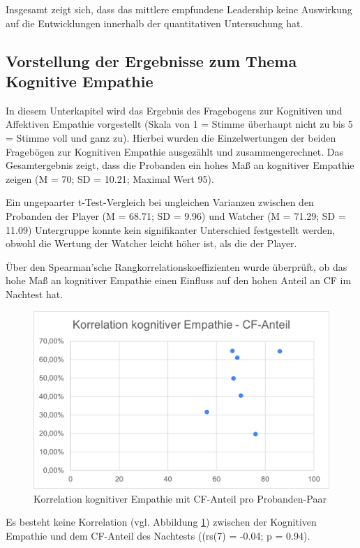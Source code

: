 Insgesamt zeigt sich, dass das mittlere empfundene Leadership keine Auswirkung auf die Entwicklungen innerhalb der quantitativen Untersuchung hat.

\subsection{Vorstellung der Ergebnisse zum Thema Kognitive Empathie}
In diesem Unterkapitel wird das Ergebnis des Fragebogens zur Kognitiven und Affektiven Empathie vorgestellt (Skala von 1 = Stimme überhaupt nicht zu bis 5 = Stimme voll und ganz zu). Hierbei wurden die Einzelwertungen der beiden Fragebögen zur Kognitiven Empathie ausgezählt und zusammengerechnet. Das Gesamtergebnis zeigt, dass die Probanden ein hohes Maß an kognitiver Empathie zeigen (M = 70; SD = 10.21; Maximal Wert 95). 

Ein ungepaarter t-Test-Vergleich bei ungleichen Varianzen zwischen den Probanden der Player (M = 68.71; SD = 9.96) und Watcher (M = 71.29; SD = 11.09) Untergruppe konnte kein signifikanter Unterschied festgestellt werden, obwohl die Wertung der Watcher leicht höher ist, als die der Player. 

Über den Spearman'sche Rangkorrelationskoeffizienten wurde überprüft, ob das hohe Maß an kognitiver Empathie einen Einfluss auf den hohen Anteil an \ac{CF} im Nachtest hat. 

\begin{figure}[ht]
\centering
\includegraphics[width=1\linewidth]{content/pictures/Korrelation_Kognitive_Empathie_cfh.png}
\caption{Korrelation kognitiver Empathie mit \ac{CF}-Anteil pro Probanden-Paar}
\label{fig:correlation_kognitive_empathy_cfh}
\end{figure}

Es besteht keine Korrelation (vgl. Abbildung \ref{fig:correlation_kognitive_empathy_cfh}) zwischen der Kognitiven Empathie und dem \ac{CF}-Anteil des Nachtests ((rs(7) = -0.04; p = 0.94).



